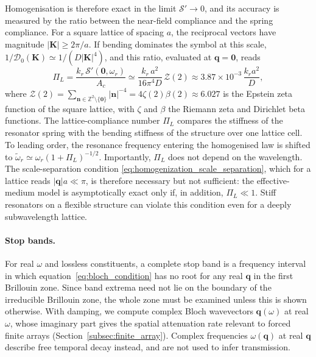 \begin{remark}
Homogenisation is therefore exact in the limit $\mathcal{S}'\to0$, and its accuracy is measured by the ratio between the near-field compliance and the spring compliance. For a square lattice of spacing $a$, the reciprocal vectors have magnitude $|\mathbf{K}|\ge2\pi/a$. If bending dominates the symbol at this scale, $1/\mathcal{D}_0(\mathbf{K})\simeq1/(D|\mathbf{K}|^4)$, and this ratio, evaluated at $\mathbf{q}=\mathbf{0}$, reads
\begin{equation}
  \label{eq:PiL}
  \Pi_L=\frac{k_r\,\mathcal{S}'(\mathbf{0},\omega_r)}{A_c}\simeq\frac{k_r\,a^2}{16\pi^4D}\,\mathcal{Z}(2)\approx3.87\times10^{-3}\,\frac{k_ra^2}{D},
\end{equation}
where $\mathcal{Z}(2)=\sum_{\mathbf{n}\in\mathbb{Z}^2\setminus\{\mathbf{0}\}}|\mathbf{n}|^{-4}=4\zeta(2)\beta(2)\approx6.027$ is the Epstein zeta function of the square lattice, with $\zeta$ and $\beta$ the Riemann zeta and Dirichlet beta functions. The lattice-compliance number $\Pi_L$ compares the stiffness of the resonator spring with the bending stiffness of the structure over one lattice cell. To leading order, the resonance frequency entering the homogenised law is shifted to $\widetilde{\omega}_r\simeq\omega_r(1+\Pi_L)^{-1/2}$. Importantly, $\Pi_L$ does not depend on the wavelength. The scale-separation condition \eqref{eq:homogenization_scale_separation}, which for a lattice reads $|\mathbf{q}|a\ll\pi$, is therefore necessary but not sufficient: the effective-medium model is asymptotically exact only if, in addition, $\Pi_L\ll1$. Stiff resonators on a flexible structure can violate this condition even for a deeply subwavelength lattice.
\end{remark}

{\color{red}
\paragraph{Stop bands.}
For real $\omega$ and lossless constituents, a complete stop band is a frequency interval in which equation~\eqref{eq:bloch_condition} has no root for any real $\mathbf{q}$ in the first Brillouin zone. Since band extrema need not lie on the boundary of the irreducible Brillouin zone, the whole zone must be examined unless this is shown otherwise. With damping, we compute complex Bloch wavevectors $\mathbf{q}(\omega)$ at real $\omega$, whose imaginary part gives the spatial attenuation rate relevant to forced finite arrays (Section~\ref{subsec:finite_array}). Complex frequencies $\omega(\mathbf{q})$ at real $\mathbf{q}$ describe free temporal decay instead, and are not used to infer transmission.
}


